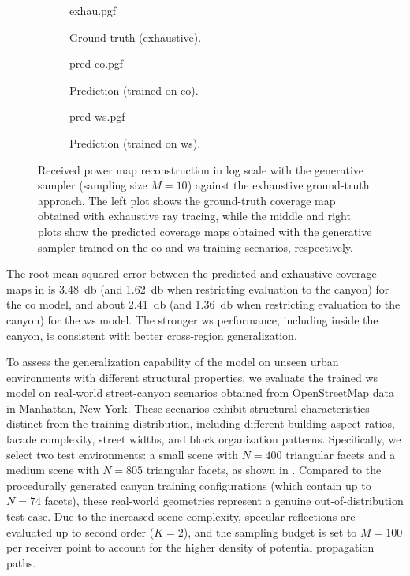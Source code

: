 \begin{figure}
  \centering
  \begin{subfigure}[t]{0.32\contentwidth}
    \centering
    {exhau.pgf}
    \caption{Ground truth (exhaustive).}
  \end{subfigure}
  \hfill
  \begin{subfigure}[t]{0.32\contentwidth}
    \centering
    {pred-co.pgf}
    \caption{Prediction (trained on \gls{co}).}
  \end{subfigure}
  \hfill
  \begin{subfigure}[t]{0.32\contentwidth}
    \centering
    {pred-ws.pgf}
    \caption{Prediction (trained on \gls{ws}).}
  \end{subfigure}
  \caption{Received power map reconstruction in log scale with the generative sampler (sampling size $M=10$) against the exhaustive ground-truth approach. The left plot shows the ground-truth coverage map obtained with exhaustive ray tracing, while the middle and right plots show the predicted coverage maps obtained with the generative sampler trained on the \gls{co} and \gls{ws} training scenarios, respectively.}
\end{figure}

The root mean squared error between the predicted and exhaustive coverage maps in  is \qty{3.48}{\decibel} (and \qty{1.62}{\decibel} when restricting evaluation to the canyon) for the \gls{co} model, and about \qty{2.41}{\decibel} (and \qty{1.36}{\decibel} when restricting evaluation to the canyon) for the \gls{ws} model. The stronger \gls{ws} performance, including inside the canyon, is consistent with better cross-region generalization.

To assess the generalization capability of the model on unseen urban environments with different structural properties, we evaluate the trained \gls{ws} model on real-world street-canyon scenarios obtained from OpenStreetMap data in Manhattan, New York. These scenarios exhibit structural characteristics distinct from the training distribution, including different building aspect ratios, facade complexity, street widths, and block organization patterns. Specifically, we select two test environments: a small scene with $N=400$ triangular facets and a medium scene with $N=805$ triangular facets, as shown in . Compared to the procedurally generated canyon training configurations (which contain up to $N=74$ facets), these real-world geometries represent a genuine out-of-distribution test case. Due to the increased scene complexity, specular reflections are evaluated up to second order ($K=2$), and the sampling budget is set to $M=100$ per receiver point to account for the higher density of potential propagation paths.


